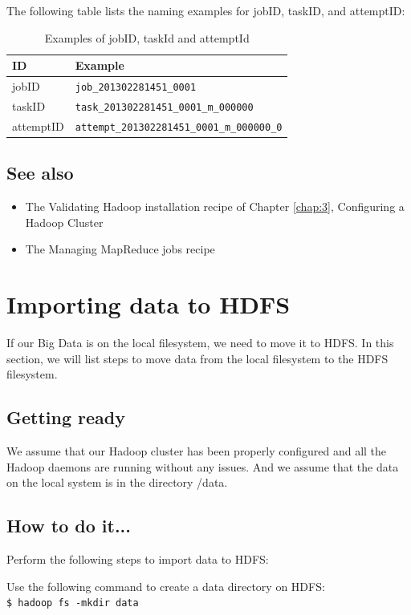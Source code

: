 The following table lists the naming examples for jobID, taskID, and attemptID:
\begin{table}
  \centering
  \begin{tabular}{ll}
    \toprule 
    \textbf{ID} & \textbf{Example} \\ \midrule
    jobID & \verb|job_201302281451_0001| \\ 
    taskID & \verb|task_201302281451_0001_m_000000| \\
    attemptID & \verb|attempt_201302281451_0001_m_000000_0| \\ \bottomrule
  \end{tabular}
  \caption{Examples of jobID, taskId and attemptId}\label{tbl:ids}
\end{table}

\subsection*{See also}
\begin{itemize}
  \item The Validating Hadoop installation recipe of Chapter \ref{chap:3}, Configuring a Hadoop Cluster
  \item The Managing MapReduce jobs recipe
\end{itemize}
\section{Importing data to HDFS}
If our Big Data is on the local filesystem, we need to move it to HDFS. In this section, we will list steps to move data from the local filesystem to the HDFS filesystem.

\subsection*{Getting ready}
We assume that our Hadoop cluster has been properly configured and all the Hadoop daemons are running without any issues. And we assume that the data on the local system is in the directory /data.
\subsection*{How to do it...}
Perform the following steps to import data to HDFS: 

Use the following command to create a data directory on HDFS: \\
\verb|$ hadoop fs -mkdir data|

